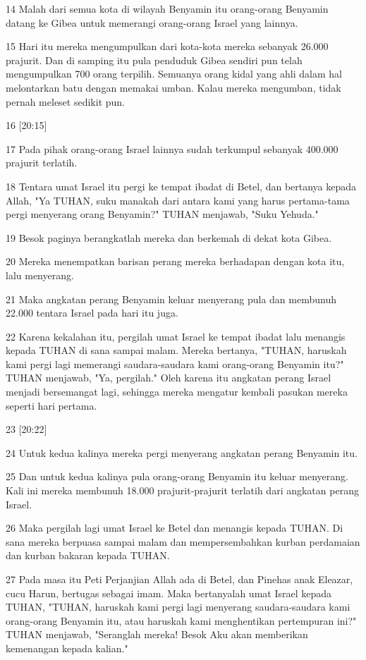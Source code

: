 \par 14 Malah dari semua kota di wilayah Benyamin itu orang-orang Benyamin datang ke Gibea untuk memerangi orang-orang Israel yang lainnya.
\par 15 Hari itu mereka mengumpulkan dari kota-kota mereka sebanyak 26.000 prajurit. Dan di samping itu pula penduduk Gibea sendiri pun telah mengumpulkan 700 orang terpilih. Semuanya orang kidal yang ahli dalam hal melontarkan batu dengan memakai umban. Kalau mereka mengumban, tidak pernah meleset sedikit pun.
\par 16 [20:15]
\par 17 Pada pihak orang-orang Israel lainnya sudah terkumpul sebanyak 400.000 prajurit terlatih.
\par 18 Tentara umat Israel itu pergi ke tempat ibadat di Betel, dan bertanya kepada Allah, "Ya TUHAN, suku manakah dari antara kami yang harus pertama-tama pergi menyerang orang Benyamin?" TUHAN menjawab, "Suku Yehuda."
\par 19 Besok paginya berangkatlah mereka dan berkemah di dekat kota Gibea.
\par 20 Mereka menempatkan barisan perang mereka berhadapan dengan kota itu, lalu menyerang.
\par 21 Maka angkatan perang Benyamin keluar menyerang pula dan membunuh 22.000 tentara Israel pada hari itu juga.
\par 22 Karena kekalahan itu, pergilah umat Israel ke tempat ibadat lalu menangis kepada TUHAN di sana sampai malam. Mereka bertanya, "TUHAN, haruskah kami pergi lagi memerangi saudara-saudara kami orang-orang Benyamin itu?" TUHAN menjawab, "Ya, pergilah." Oleh karena itu angkatan perang Israel menjadi bersemangat lagi, sehingga mereka mengatur kembali pasukan mereka seperti hari pertama.
\par 23 [20:22]
\par 24 Untuk kedua kalinya mereka pergi menyerang angkatan perang Benyamin itu.
\par 25 Dan untuk kedua kalinya pula orang-orang Benyamin itu keluar menyerang. Kali ini mereka membunuh 18.000 prajurit-prajurit terlatih dari angkatan perang Israel.
\par 26 Maka pergilah lagi umat Israel ke Betel dan menangis kepada TUHAN. Di sana mereka berpuasa sampai malam dan mempersembahkan kurban perdamaian dan kurban bakaran kepada TUHAN.
\par 27 Pada masa itu Peti Perjanjian Allah ada di Betel, dan Pinehas anak Eleazar, cucu Harun, bertugas sebagai imam. Maka bertanyalah umat Israel kepada TUHAN, "TUHAN, haruskah kami pergi lagi menyerang saudara-saudara kami orang-orang Benyamin itu, atau haruskah kami menghentikan pertempuran ini?" TUHAN menjawab, "Seranglah mereka! Besok Aku akan memberikan kemenangan kepada kalian."
